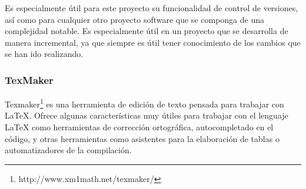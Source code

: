 Es especialmente útil para este proyecto su funcionalidad de control de versiones, así como para cualquier otro proyecto software que se componga de una complejidad notable. Es especialmente útil en un proyecto que se desarrolla de manera incremental, ya que siempre es útil tener conocimiento de los cambios que se han ido realizando.

\subsubsection{TexMaker}

Texmaker\footnote{http://www.xm1math.net/texmaker/} es una herramienta de edición de texto pensada para trabajar con LaTeX. Ofrece algunas características muy útiles para trabajar con el lenguaje LaTeX como herramientas de corrección ortográfica, autocompletado en el código, y otras herramientas como asistentes para la elaboración de tablas o automatizadores de la compilación.



 
